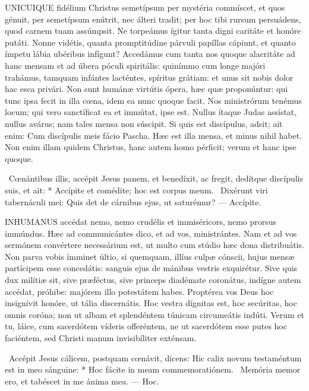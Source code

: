 \lettrine[lines=2]{U}{NICUIQUE} fidélium Christus semetípsum per mystéria commíscet, et quos génuit, per semetípsum enútrit, nec álteri tradit; per hoc tibi rursum persuádens, quod carnem tuam assúmpsit. Ne torpeámus ígitur tanta digni caritáte et honóre putáti. Nonne vidétis, quanta promptitúdine párvuli papíllas cápiunt, et quanto ímpetu lábia ubéribus infígunt? Accedámus cum tanta nos quoque alacritáte ad hanc mensam et ad úbera póculi spiritális: quinímmo cum longe majóri trahámus, tamquam infántes lacténtes, spíritus grátiam: et unus sit nobis dolor hac esca privári. Non sunt humánæ virtútis ópera, hæc quæ proponúntur: qui tunc ipsa fecit in illa cœna, idem ea nunc quoque facit. Nos ministrórum tenémus locum; qui vero sanctíficat ea et immútat, ipse est. Nullus ítaque Judas assístat, nullus avárus; nam tales mensa non súscipit. Si quis est discípulus, adsit; ait enim: Cum discípulis meis fácio Pascha. Hæc est illa mensa, et minus nihil habet. Non enim illam quidem Christus, hanc autem homo pérficit; verum et hanc ipse quoque.

\R\ Cœnántibus illis, accépit Jesus panem, et benedíxit, ac fregit, dedítque discípulis suis, et ait: * Accípite et comédite; hoc est corpus meum. \V\ Dixérunt viri tabernáculi mei: Quis det de cárnibus ejus, ut saturémur? --- Accípite.


\lettrine[lines=2]{I}{NHUMANUS} accédat nemo, nemo crudélis et immiséricors, nemo prorsus immúndus. Hæc ad communicántes dico, et ad vos, ministrántes. Nam et ad vos sermónem convértere necessárium est, ut multo cum stúdio hæc dona distribuátis. Non parva vobis ímminet últio, si quemquam, illíus culpæ cónscii, hujus mensæ partícipem esse concedátis: sanguis ejus de mánibus vestris exquirétur. Sive quis dux milítiæ sit, sive præféctus, sive princeps diadémate coronátus, indígne autem accédat, próhibe: majórem illo potestátem habes. Proptérea vos Deus hoc insignívit honóre, ut tália discernátis. Hoc vestra dígnitas est, hoc secúritas, hoc omnis coróna; non ut albam et splendéntem túnicam circumeátis indúti. Verum et tu, láice, cum sacerdótem víderis offeréntem, ne ut sacerdótem esse putes hoc faciéntem, sed Christi manum invisibíliter exténsam.

\R\ Accépit Jesus cálicem, postquam cœnávit, dicens: Hic calix novum testaméntum est in meo sánguine: * Hoc fácite in meam commemoratiónem. \V\ Memória memor ero, et tabéscet in me ánima mea. --- Hoc.


